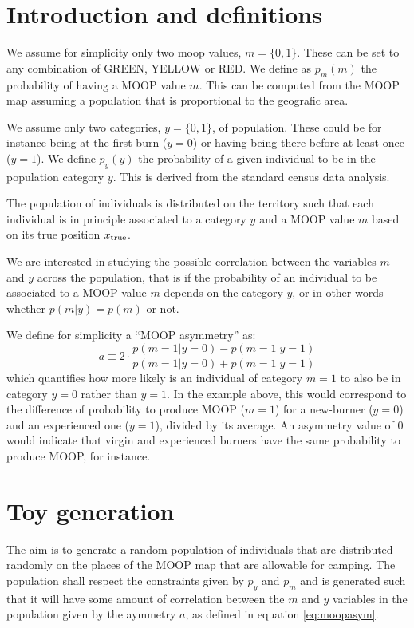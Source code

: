 \documentclass{article}
\begin{document}
\section{Introduction and definitions}

We assume for simplicity only two moop values, $m=\{0,1\}$. 
These can be set to any combination of {\sc GREEN}, {\sc YELLOW} or {\sc RED}.
We define as $p_m(m)$ the probability of having a MOOP value $m$. 
This can be computed from the MOOP map assuming a population that is proportional to the geografic area. 

We assume only two categories, $y=\{0,1\}$, of population.
These could be for instance being at the first burn ($y=0$) or having being there before at least once ($y=1$).
We define $p_y(y)$ the probability of a given individual to be in the population category $y$.
This is derived from the standard census data analysis.

The population of individuals is distributed on the territory such that each individual is in principle
associated to a category $y$ and a MOOP value $m$ based on its true position $x_{\rm true}$.

We are interested in studying the possible correlation between the variables $m$ and $y$ across the population,
that is if the probability of an individual to be associated to a MOOP value $m$ depends on the category $y$, 
or in other words whether $p(m | y) = p(m)$ or not.

We define for simplicity a ``MOOP asymmetry'' as:
\begin{equation}
\label{eq:moopasym}
a \equiv 2\cdot \frac{p(m=1 | y=0) - p(m=1 | y=1)}{p(m=1 | y=0) + p(m=1 | y=1)}
\end{equation}
 which quantifies how more likely is an individual of category $m=1$ to also be in category $y=0$ rather than $y=1$.
In the example above, this would correspond to the difference of probability to produce MOOP ($m=1$) for a new-burner ($y=0$)
and an experienced one ($y=1$), divided by its average. An asymmetry value of $0$ would indicate that 
virgin and experienced burners have the same probability to produce MOOP, for instance.

\section{Toy generation}
The aim is to generate a random population of individuals that are distributed randomly on the places of the MOOP map
that are allowable for camping.
The population shall respect the constraints given by $p_y$ and $p_m$ and is generated such that it will have some
amount of correlation between the $m$ and $y$ variables in the population given by the aymmetry $a$, as defined in equation \ref{eq:moopasym}.
\end{document}
